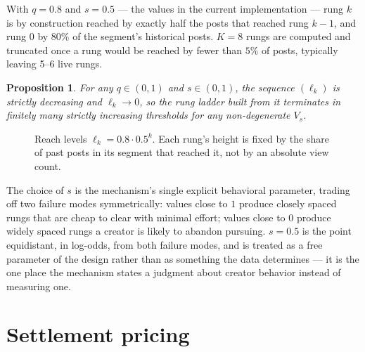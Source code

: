 \documentclass[11pt]{article}
\newtheorem{proposition}{Proposition}
\begin{document}
With $q = 0.8$ and $s = 0.5$ — the values in the current implementation — rung $k$ is by
construction reached by exactly half the posts that reached rung $k-1$, and rung 0 by 80\% of the
segment's historical posts. $K = 8$ rungs are computed and truncated once a rung would be reached
by fewer than $5\%$ of posts, typically leaving 5–6 live rungs.

\begin{proposition}
For any $q \in (0,1)$ and $s \in (0,1)$, the sequence $(\ell_k)$ is strictly decreasing and
$\ell_k \to 0$, so the rung ladder built from it terminates in finitely many strictly increasing
thresholds for any non-degenerate $V_s$.
\end{proposition}

\begin{figure}[h]
\centering
{}
\caption{Reach levels $\ell_k = 0.8 \cdot 0.5^k$. Each rung's height is fixed by the share of past
posts in its segment that reached it, not by an absolute view count.}
\label{fig:reachlevels}
\end{figure}

The choice of $s$ is the mechanism's single explicit behavioral parameter, trading off two failure
modes symmetrically: values close to $1$ produce closely spaced rungs that are cheap to clear with
minimal effort; values close to $0$ produce widely spaced rungs a creator is likely to abandon
pursuing. $s = 0.5$ is the point equidistant, in log-odds, from both failure modes, and is treated
as a free parameter of the design rather than as something the data determines — it is the one
place the mechanism states a judgment about creator behavior instead of measuring one.

\section{Settlement pricing}
\label{sec:pricing}
\end{document}
